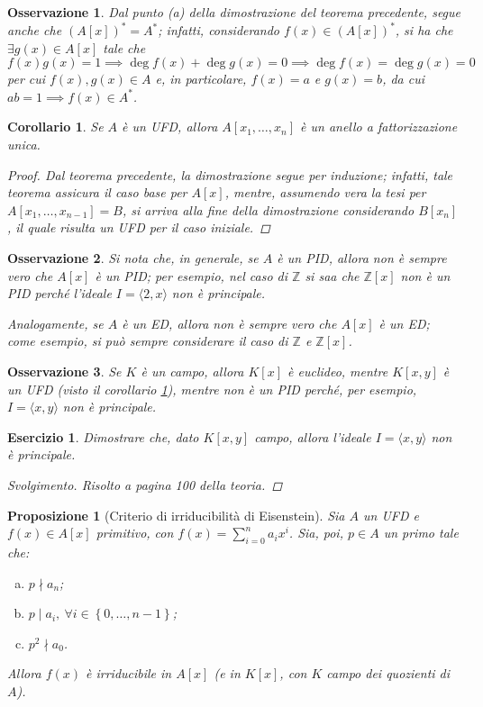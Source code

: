 \documentclass[12pt]{scrartcl}
\theoremstyle{style}
\newtheorem{prop}{Proposizione}[section]
\newtheorem{corollario}{Corollario}[teorema]
\newtheorem{osservazione}{Osservazione}[section]
\newtheorem{esercizio}{Esercizio}[section]
\newenvironment{svolgimento}{\renewcommand\qedsymbol{$\blacksquare$}\begin{proof}[Svolgimento]}{\end{proof}}
\numberwithin{equation}{subsection}
\begin{document}
\begin{osservazione}
	Dal punto (a) della dimostrazione del teorema precedente, segue anche che $(A[x])^* = A^*$; infatti, considerando $f(x) \in (A[x])^*$, si ha che $\exists g(x) \in A[x]$ tale che 
	\[
	f(x) g(x) = 1\implies \operatorname{deg} f(x) + \operatorname{deg} g(x) = 0\implies \operatorname{deg} f(x) = \operatorname{deg} g(x) = 0
	\] 
	per cui $f(x), g(x) \in A$ e, in particolare, $f(x) = a$ e $g(x) = b$, da cui $ab =1\implies f(x) \in A^*$.
\end{osservazione}
\begin{corollario}\label{corufdcat}
	Se $A$ \`e un UFD, allora $A[x_1,\ldots,x_n]$ \`e un anello a fattorizzazione unica.
	\begin{proof}
		Dal teorema precedente, la dimostrazione segue per induzione; infatti, tale teorema assicura il caso base per $A[x]$, mentre, assumendo vera la tesi per $A [x_1,\ldots,x_{n-1} ] = B$, si arriva alla fine della dimostrazione considerando $B[x_n]$, il quale risulta un UFD per il caso iniziale.
	\end{proof}
\end{corollario}
\begin{osservazione}
	Si nota che, in generale, se $A$ \`e un PID, allora non \`e sempre vero che $A[x]$ \`e un PID; per esempio, nel caso di $\mathbb{Z}$ si saa che $\mathbb{Z}[x]$ non \`e un PID perch\'e l'ideale $I = \langle 2,x \rangle$ non \`e principale.

	Analogamente, se $A$ \`e un ED, allora non \`e sempre vero che $A[x]$ \`e un ED; come esempio, si pu\`o sempre considerare il caso di $\mathbb{Z}$ e $\mathbb{Z}[x]$.
\end{osservazione}
\begin{osservazione}
	Se $K$ \`e un campo, allora $K[x]$ \`e euclideo, mentre $K[x,y]$ \`e un UFD (visto il corollario \ref{corufdcat}), mentre non \`e un PID perch\'e, per esempio, $I =\langle x,y \rangle$ non \`e principale.
\end{osservazione}
\begin{esercizio}
	Dimostrare che, dato $K[x,y]$ campo, allora l'ideale $I=\langle x,y \rangle$ non \`e principale.
	\begin{svolgimento}
		Risolto a pagina 100 della teoria.
	\end{svolgimento}
\end{esercizio}
\begin{prop}
	[Criterio di irriducibilit\`a di Eisenstein]
	Sia $A$ un UFD e $f(x) \in A[x]$ primitivo, con $f(x) = \sum_{i=0}^{n} a_ix^i$.
	Sia, poi, $p \in A$ un primo tale che:
	\begin{enumerate}[(a).]
		\item $p\nmid a_n$;
		\item $p  \mid a_i , \ \forall i \in \left\{ 0,\ldots,n-1 \right\} $;
		\item $p^2 \nmid a_0$.
	\end{enumerate}
	Allora $f(x)$ \`e irriducibile in $A[x]$ (e in $K[x]$, con $K$ campo dei quozienti di $A$).
\end{prop}
\end{document}
